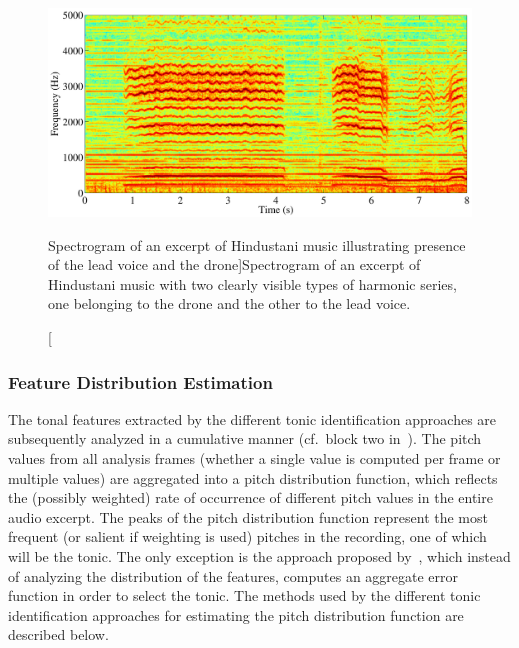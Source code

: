 \begin{figure}
	\begin{center}
		\includegraphics[width=\figSizeNinety]{ch02_background/figures/2HarmonicSeries.pdf}
	\end{center}
	\caption[Spectogram of an excerpt of Hindustani music][Spectrogram of an excerpt of Hindustani music illustrating presence of the lead voice and the drone]{Spectrogram of an excerpt of Hindustani music with two clearly visible types of harmonic series, one belonging to the drone and the other to the lead voice.}
	\label{fig:2HarmonicSeries}
\end{figure}


\subsubsection{Feature Distribution Estimation}
\label{sec:background_tonic_feature_distribution_estimation}

The tonal features extracted by the different tonic identification approaches are subsequently analyzed in a cumulative manner (cf.~block two in~). The pitch values from all analysis frames (whether a single value is computed per frame or multiple values) are aggregated into a pitch distribution function, which reflects the (possibly weighted) rate of occurrence of different pitch values in the entire audio excerpt. The peaks of the pitch distribution function represent the most frequent (or salient if weighting is used) pitches in the recording, one of which will be the tonic. The only exception is the approach proposed by~\cite{Sengupta2005b}, which instead of analyzing the distribution of the features, computes an aggregate error function in order to select the tonic. The methods used by the different tonic identification approaches for estimating the pitch distribution function are described below.


